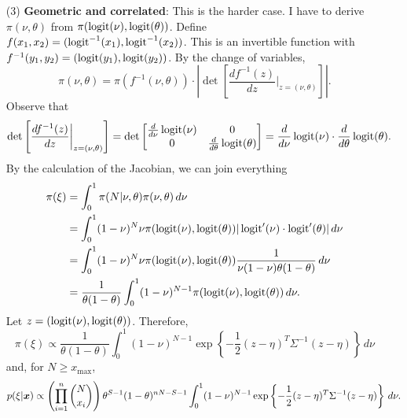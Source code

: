 \begin{enumerate}
    \item[(3)]  {\bf Geometric and correlated}: This is the harder case. I
    have to derive $\pi(\nu,\theta)$ from $\pi(\operatorname{logit}(\nu), \operatorname{logit}(\theta))$.
    Define $f(x_1,x_2) = (\operatorname{logit}^{-1}(x_1), \operatorname{logit}^{-1}(x_2))$. This is an
    invertible function with $f^{-1}(y_1,y_2) = (\operatorname{logit}(y_1), \operatorname{logit}(y_2))$. By
    the change of variables, 
    $$
    \pi(\nu,\theta) = \pi(f^{-1}(\nu, \theta))\cdot\left|\det \left[\frac{df^{-1}(z)}{dz}\bigg|_{z=(\nu,\theta)}\right]\right|.
    $$
    Observe that 
    $$
    \det \left[\frac{df^{-1}(z)}{dz}\bigg|_{z=(\nu,\theta)}\right] = \det \begin{bmatrix}
        \frac{d}{d\nu}\operatorname{logit}(\nu) & 0 \\
        0 & \frac{d}{d\theta}\operatorname{logit}(\theta)
    \end{bmatrix} = \frac{d}{d\nu}\operatorname{logit}(\nu) \cdot \frac{d}{d\theta}\operatorname{logit}(\theta).
    $$
    By the calculation of the Jacobian, we can join everything
    \begin{equation*}
        \begin{split}
            \pi(\xi) &= \int_0^{1} \pi(N|\nu,\theta)\pi(\nu,\theta) \, d\nu  \\
            &= \int_0^1 (1-\nu)^N\nu \pi(\operatorname{logit}(\nu), \operatorname{logit}(\theta))|\operatorname{logit} '(\nu) \cdot \operatorname{logit} '(\theta)| \, d\nu \\
            &= \int_0^1 (1-\nu)^N\nu \pi(\operatorname{logit}(\nu), \operatorname{logit}(\theta))\frac{1}{\nu(1-\nu)\theta(1-\theta)}\, d\nu \\ 
            &= \frac{1}{\theta(1-\theta)}\int_0^1 (1-\nu)^{N-1}\pi(\operatorname{logit}(\nu), \operatorname{logit}(\theta)) \, d\nu . \\
        \end{split}
    \end{equation*} 
    Let $z = (\operatorname{logit}(\nu), \operatorname{logit}(\theta))$. Therefore, 
    \begin{equation}
        \label{eq:prior-geom-corr}
        \pi(\xi) \propto \frac{1}{\theta(1-\theta)}\int_0^1 (1-\nu)^{N-1}\exp\left\{-\frac{1}{2}(z - \eta)^T\Sigma^{-1}(z-\eta)\right\} \, d\nu
    \end{equation}
    and, for $N \ge x_{\max}$, 
    \begin{equation}
        \label{eq:posterior-geom-corr}
        p(\xi|\boldsymbol{x}) \propto \left(\prod_{i=1}^n \binom{N}{x_i}\right)\theta^{S-1}(1 - \theta)^{nN - S-1}\int_0^1 (1-\nu)^{N-1}\exp\left\{-\frac{1}{2}(z - \eta)^T\Sigma^{-1}(z-\eta)\right\} \, d\nu.
    \end{equation}

\end{enumerate}

\vspace{2ex}